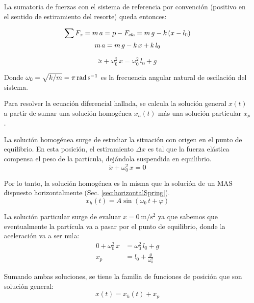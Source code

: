 La sumatoria de fuerzas con el sistema de referencia por convención (positivo en el sentido de estiramiento del resorte) queda entonces:

\begin{gather*}
    \sum F_x = m \, a = \textsl{p} - {{F}_\textsl{{ela}}}  = m \, g - k \left(x-l_0\right)
    \\
    m \, a = m \, g - k \, x + k \, l_0
\end{gather*}

\begin{mdframed}[style=DefinitionFrame]
    \begin{defn}
        \label{defn:}
    \end{defn}
    \begin{equation*}
        \ddot{x} + \omega_0^2 \, x = \omega_0^2 \, l_0 + g
    \end{equation*}
\end{mdframed}

Donde $\omega_0 = \sqrt{k/m}=\pi\,\si{\radian\per\second}$ es la frecuencia angular natural de oscilación del sistema.

Para resolver la ecuación diferencial hallada, se calcula la solución general $x(t)$ a partir de sumar una solución homogénea $x_h(t)$ más una solución particular $x_p$.

La solución homogénea surge de estudiar la situación con origen en el punto de equilibrio.
En esta posición, el estiramiento $\Delta x$ es tal que la fuerza elástica compensa el peso de la partícula, dejándola suspendida en equilibrio.
\[ \ddot{x} + \omega_0^2 \, x = 0 \]

Por lo tanto, la solución homogénea es la misma que la solución de un MAS dispuesto horizontalmente (Sec. \ref{sec:horizontalSpring}).
\[ x_h(t) = A \sin{(\omega_0 \, t + \varphi)} \]

La solución particular surge de evaluar $\ddot{x} = \SI{0}{\metre \per \second^2}$ ya que sabemos que eventualmente la partícula va a pasar por el punto de equilibrio, donde la aceleración va a ser nula:
\begin{align*}
    0 + \omega_0^2 \, x &= \omega_0^2 \, l_0 + g
    \\
    x_p &= l_0 + \frac{g}{\omega_0^2}
\end{align*}

Sumando ambas soluciones, se tiene la familia de funciones de posición que son solución general:
\begin{equation*}
    x(t) = x_h(t) + x_p
\end{equation*}

